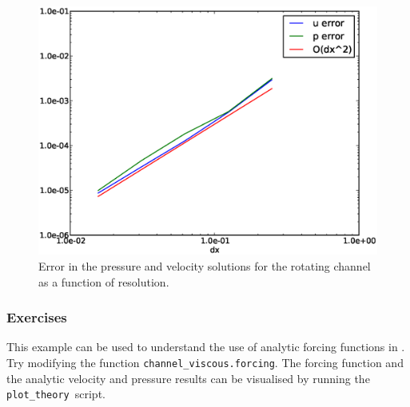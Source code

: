 \begin{figure}[htbp]
  \centering
  \onlypdf{\begin{pdfdisplay}}
    \includegraphics[width=1.1\textwidth]{examples_images/rotating_channel/convergence.eps}
  \onlypdf{\end{pdfdisplay}}  
  \caption{Error in the pressure and velocity solutions for the rotating channel as a function of resolution.}
  \label{fig:periodic_channel_error}
\end{figure}

\subsubsection{Exercises}

This example can be used to understand the use of analytic forcing
functions in \fluidity. Try modifying the function
\lstinline[language=python]{channel_viscous.forcing}. The forcing function
and the analytic velocity and pressure results can be visualised by running
the \lstinline[language=python]{plot_theory}\ script. 

